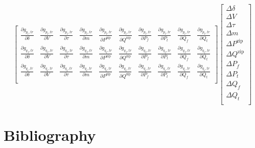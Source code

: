 \documentclass[11pt]{article}
\begin{document}
\begin{equation}
\begin{bmatrix}
		\frac{\partial g_{p_t,tr}}{\partial \delta} & \frac{\partial g_{p_t,tr}}{\partial V} & \frac{\partial g_{p_t,tr}}{\partial \tau} & \frac{\partial g_{p_t,tr}}{\partial m} & \frac{\partial g_{p_t,tr}}{\partial P^\text{zip}} & \frac{\partial g_{p_t,tr}}{\partial Q^\text{zip}} & \frac{\partial g_{p_t,tr}}{\partial P_f} & \frac{\partial g_{p_t,tr}}{\partial P_t} & \frac{\partial g_{p_t,tr}}{\partial Q_f} & \frac{\partial g_{p_t,tr}}{\partial Q_t} \\
		\frac{\partial g_{q_f,tr}}{\partial \delta} & \frac{\partial g_{q_f,tr}}{\partial V} & \frac{\partial g_{q_f,tr}}{\partial \tau} & \frac{\partial g_{q_f,tr}}{\partial m} & \frac{\partial g_{q_f,tr}}{\partial P^\text{zip}} & \frac{\partial g_{q_f,tr}}{\partial Q^\text{zip}} & \frac{\partial g_{q_f,tr}}{\partial P_f} & \frac{\partial g_{q_f,tr}}{\partial P_t} & \frac{\partial g_{q_f,tr}}{\partial Q_f} & \frac{\partial g_{q_f,tr}}{\partial Q_t} \\
		\frac{\partial g_{q_t,tr}}{\partial \delta} & \frac{\partial g_{q_t,tr}}{\partial V} & \frac{\partial g_{q_t,tr}}{\partial \tau} & \frac{\partial g_{q_t,tr}}{\partial m} & \frac{\partial g_{q_t,tr}}{\partial P^\text{zip}} & \frac{\partial g_{q_t,tr}}{\partial Q^\text{zip}} & \frac{\partial g_{q_t,tr}}{\partial P_f} & \frac{\partial g_{q_t,tr}}{\partial P_t} & \frac{\partial g_{q_t,tr}}{\partial Q_f} & \frac{\partial g_{q_t,tr}}{\partial Q_t} \\
	\end{bmatrix}
	\begin{bmatrix}
		\Delta \delta \\
		\Delta V \\
		\Delta \tau \\
		\Delta m \\
		\Delta P^\text{zip} \\
		\Delta Q^\text{zip} \\
		\Delta P_f \\
		\Delta P_t \\
		\Delta Q_f \\
		\Delta Q_t \\
	\end{bmatrix}
\end{equation}
	
	
\section{Bibliography}
	\printbibliography
	
\end{document}
